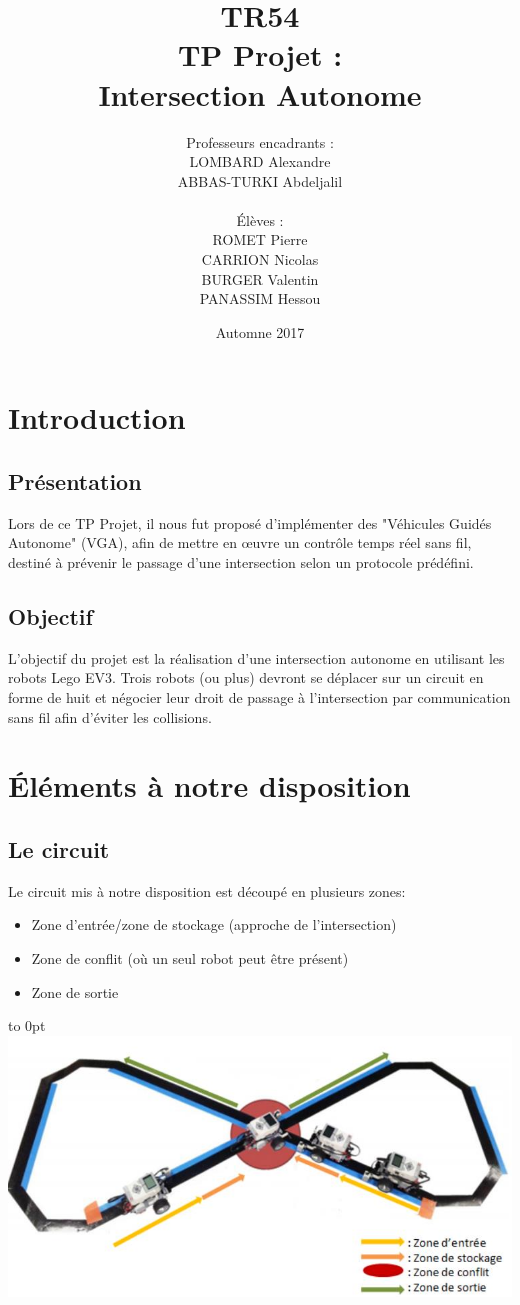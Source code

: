 \documentclass[french,a4paper,12pt]{report}
\title{TR54 \\ TP Projet :\\ Intersection Autonome}
\author{Professeurs encadrants :\\LOMBARD Alexandre \\ ABBAS-TURKI Abdeljalil\\\\ Élèves :\\ROMET Pierre\\CARRION Nicolas\\BURGER Valentin\\PANASSIM Hessou}
\date{Automne 2017}
\begin{document}
\maketitle

\tableofcontents

\part{Introduction}

\chapter{Présentation}
Lors de ce TP Projet,
il nous fut proposé d'implémenter des "Véhicules Guidés Autonome" (VGA), afin de mettre en œuvre un contrôle
temps réel sans fil, destiné à prévenir le passage d'une intersection selon un protocole prédéfini.

\chapter{Objectif}
L'objectif du projet est la réalisation d'une intersection autonome en utilisant les robots Lego EV3.
Trois robots (ou plus) devront se déplacer sur un circuit en forme de huit et négocier leur droit de passage à
l'intersection par communication sans fil afin d'éviter les collisions.

\part{Éléments à notre disposition}

\chapter{Le circuit}
Le circuit mis à notre disposition est découpé en plusieurs zones:
\begin{itemize}
\item Zone d’entrée/zone de stockage (approche de l’intersection)
\item Zone de conflit (où un seul robot peut être présent)
\item Zone de sortie
\end{itemize}

\hfill\hbox to 0pt{\hss\includegraphics[width=15cm]{circuit.png}\hss}\hfill\null\newline
\end{document}
